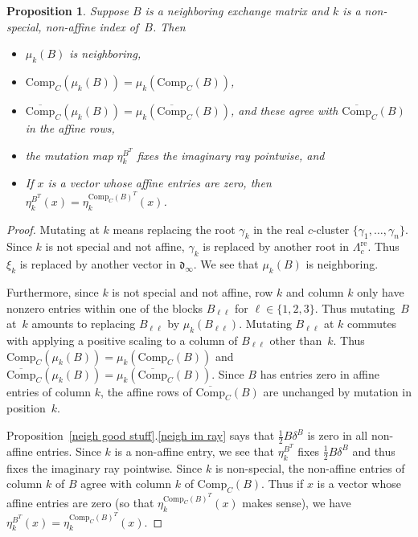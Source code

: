 \documentclass{amsart}
\newtheorem{proposition}{Proposition}[section]
\theoremstyle{definition}
\theoremstyle{remark}
\numberwithin{equation}{section}
\newcommand{\set}[1]{{\lbrace #1 \rbrace}}
\newcommand{\0}{{\mathbf{0}}}
\newcommand{\Comp}{\mathrm{Comp}_C}
\newcommand{\CompPlus}{\overline{\mathrm{Comp}}_C}
\newcommand{\re}{\mathrm{re}}
\renewcommand{\d}{{\mathfrak d}}
\newcommand{\APTChar}{\Lambda}
\newcommand{\APT}[1]{\APTChar_{#1}}
\newcommand{\APTre}[1]{\APT{#1}^\re}
\begin{document}
\begin{proposition}\label{nonspecial mut}
Suppose $B$ is a neighboring exchange matrix and $k$ is a non-special, non-affine index of~$B$.
Then 
\begin{itemize}
\item
$\mu_k(B)$ is neighboring,
\item
$\Comp(\mu_k(B))=\mu_k(\Comp(B))$,
\item
$\CompPlus(\mu_k(B))=\mu_k(\CompPlus(B))$, and these agree with $\CompPlus(B)$ in the affine rows,
\item
the mutation map $\eta^{B^T}_k$ fixes the imaginary ray pointwise, and 
\item
If $x$ is a vector whose affine entries are zero, then $\eta^{B^T}_k(x)=\eta^{\Comp(B)^T}_k(x)$.
\end{itemize}
\end{proposition}
\begin{proof}
Mutating at $k$ means replacing the root $\gamma_k$ in the real $c$-cluster $\set{\gamma_1,\ldots,\gamma_n}$.
Since $k$ is not special and not affine, $\gamma_k$ is replaced by another root in $\APTre{c}$.
Thus $\xi_k$ is replaced by another vector in $\d_\infty$.
We see that $\mu_k(B)$ is neighboring.

Furthermore, since $k$ is not special and not affine, row $k$ and column $k$ only have nonzero entries within one of the blocks $B_{\ell\ell}$ for $\ell\in\set{1,2,3}$.
Thus mutating~$B$ at~$k$ amounts to replacing $B_{\ell\ell}$ by $\mu_k(B_{\ell\ell})$.
Mutating $B_{\ell\ell}$ at $k$ commutes with applying a positive scaling to a column of $B_{\ell\ell}$ other than~$k$.
Thus $\Comp(\mu_k(B))=\mu_k(\Comp(B))$ and ${\CompPlus(\mu_k(B))=\mu_k(\CompPlus(B))}$.
Since $B$ has entries zero in affine entries of column $k$, the affine rows of $\CompPlus(B)$ are unchanged by mutation in position~$k$.

Proposition~\ref{neigh good stuff}.\ref{neigh im ray} says that $\frac12B\delta^B$ is zero in all non-affine entries.
Since $k$ is a non-affine entry, we see that $\eta^{B^T}_k$ fixes $\frac12B\delta^B$ and thus fixes the imaginary ray pointwise.
Since $k$ is non-special, the non-affine entries of column $k$ of $B$ agree with column $k$ of $\Comp(B)$.
Thus if $x$ is a vector whose affine entries are zero (so that $\eta^{\Comp(B)^T}_k(x)$ makes sense), we have $\eta^{B^T}_k(x)=\eta^{\Comp(B)^T}_k(x)$.
\end{proof}
\end{document}
